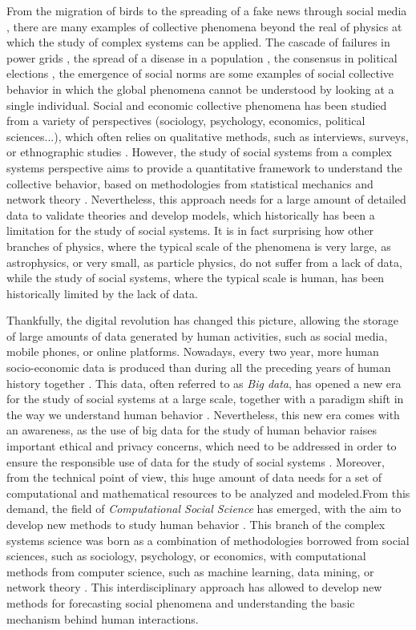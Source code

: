 From the migration of birds \cite{roche-1997} to the spreading of a fake news through social media \cite{vosoughi-2018}, there are many examples of collective phenomena beyond the real of physics at which the study of complex systems can be applied. The cascade of failures in power grids \cite{dobson-2007}, the spread of a disease in a population \cite{anderson1991infectious}, the consensus in political elections \cite{anderson-2000}, the emergence of social norms \cite{ellickson-1999} are some examples of social collective behavior in which the global phenomena cannot be understood by looking at a single individual. Social and economic collective phenomena has been studied from a variety of perspectives (sociology, psychology, economics, political sciences...), which often relies on qualitative methods, such as interviews, surveys, or ethnographic studies \cite{bryman-2010}. However, the study of social systems from a complex systems perspective aims to provide a quantitative framework to understand the collective behavior, based on methodologies from statistical mechanics and network theory \cite{newman-book,barabasi-2013}. Nevertheless, this approach needs for a large amount of detailed data to validate theories and develop models, which historically has been a limitation for the study of social systems. It is in fact surprising how other branches of physics, where the typical scale of the phenomena is very large, as astrophysics, or very small, as particle physics, do not suffer from a lack of data, while the study of social systems, where the typical scale is human, has been historically limited by the lack of data.

Thankfully, the digital revolution has changed this picture, allowing the storage of large amounts of data generated by human activities, such as social media, mobile phones, or online platforms. Nowadays, every two year, more human socio-economic data is produced than during all the preceding years of human history together \cite{karsai2019computational}. This data, often referred to as \textit{Big data}, has opened a new era for the study of social systems at a large scale, together with a paradigm shift in the way we understand human behavior \cite{manyika-2011}. Nevertheless, this new era comes with an awareness, as the use of big data for the study of human behavior raises important ethical and privacy concerns, which need to be addressed in order to ensure the responsible use of data for the study of social systems \cite{boyd-2012}. Moreover, from the technical point of view, this huge amount of data needs for a set of computational and mathematical resources to be analyzed and modeled.From this demand, the field of \textit{Computational Social Science} has emerged, with the aim to develop new methods to study human behavior \cite{lazer-2009}. This branch of the complex systems science was born as a combination of methodologies borrowed from social sciences, such as sociology, psychology, or economics, with computational methods from computer science, such as machine learning, data mining, or network theory \cite{watts-2007}. This interdisciplinary approach has allowed to develop new methods for forecasting social phenomena and understanding the basic mechanism behind human interactions. 

